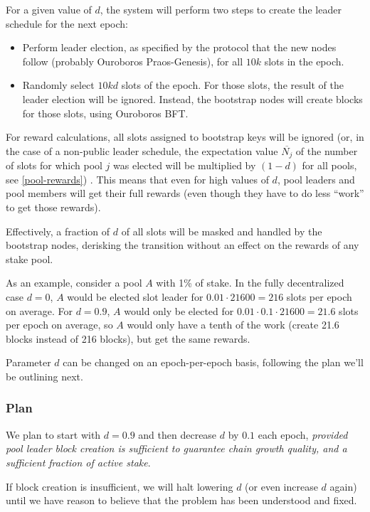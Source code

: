\documentclass[11pt,a4paper]{article}
\newcommand*\mean[1]{\overline{#1}}
\begin{document}
For a given value of \(d\), the system will perform two steps to create the
leader schedule for the next epoch:
\begin{itemize}
\item Perform leader election, as specified by the protocol that the new nodes
  follow (probably Ouroboros Praos-Genesis), for all \(10 k\) slots in the
  epoch.
\item Randomly select \(10 k d\) slots of the epoch. For those slots, the result
  of the leader election will be ignored. Instead, the bootstrap nodes will
  create blocks for those slots, using Ouroboros BFT.
\end{itemize}

For reward calculations, all slots assigned to bootstrap keys will be ignored
(or, in the case of a non-public leader schedule, the expectation value
\(\mean{N_j}\) of the number of slots for which pool \(j\) was elected will be
multiplied by \((1-d)\) for all pools, see \cref{pool-rewards}) . This means that
even for high values of \(d\), pool leaders and pool members will get their full
rewards (even though they have to do less ``work'' to get those rewards).

Effectively, a fraction of \(d\) of all slots will be masked and handled by the
bootstrap nodes, derisking the transition without an effect on the rewards of
any stake pool.

As an example, consider a pool \(A\) with 1\% of stake. In the fully
decentralized case \(d=0\), \(A\) would be elected slot leader for
\(0.01\cdot 21600=216\) slots per epoch on average. For \(d=0.9\), \(A\)
would only be elected for \(0.01\cdot 0.1\cdot 21600=21.6\) slots per
epoch on average, so \(A\) would only have a tenth of the work (create
21.6 blocks instead of 216 blocks), but get the same rewards.

Parameter \(d\) can be changed on an epoch-per-epoch basis, following
the plan we'll be outlining next.

\subsubsection{Plan}
\label{plan}

We plan to start with \(d=0.9\) and then decrease \(d\) by \(0.1\) each
epoch, \emph{provided pool leader block creation is sufficient to
guarantee chain growth quality, and a sufficient fraction of active
stake}.

If block creation is insufficient, we will halt lowering \(d\) (or even
increase \(d\) again) until we have reason to believe that the problem
has been understood and fixed.
\end{document}
